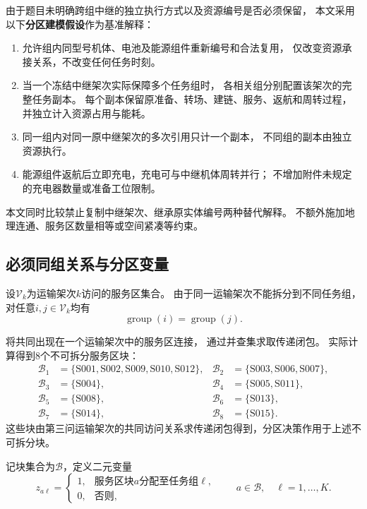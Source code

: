 \documentclass[bwprint]{gmcmthesis}
\begin{document}
由于题目未明确跨组中继的独立执行方式以及资源编号是否必须保留，
本文采用以下\textbf{分区建模假设}作为基准解释：

\begin{enumerate}
    \item 允许组内同型号机体、电池及能源组件重新编号和合法复用，
    仅改变资源承接关系，不改变任何任务时刻。

    \item 当一个冻结中继架次实际保障多个任务组时，
    各相关组分别配置该架次的完整任务副本。
    每个副本保留原准备、转场、建链、服务、返航和周转过程，
    并独立计入资源占用与能耗。

    \item 同一组内对同一原中继架次的多次引用只计一个副本，
    不同组的副本由独立资源执行。

    \item 能源组件返航后立即充电，充电可与中继机体周转并行；
    不增加附件未规定的充电器数量或准备工位限制。
\end{enumerate}

本文同时比较禁止复制中继架次、继承原实体编号两种替代解释。
不额外施加地理连通、服务区数量相等或空间紧凑等约束。

\subsection{必须同组关系与分区变量}

设$\mathcal{V}_k$为运输架次$k$访问的服务区集合。
由于同一运输架次不能拆分到不同任务组，
对任意$i,j\in\mathcal{V}_k$均有
\begin{equation}
\operatorname{group}(i)=\operatorname{group}(j).
\end{equation}

将共同出现在一个运输架次中的服务区连接，
通过并查集求取传递闭包。
实际计算得到8个不可拆分服务区块：
\begin{align*}
\mathcal B_1&=\{\mathrm{S001,S002,S009,S010,S012}\},&
\mathcal B_2&=\{\mathrm{S003,S006,S007}\},\\
\mathcal B_3&=\{\mathrm{S004}\},&
\mathcal B_4&=\{\mathrm{S005,S011}\},\\
\mathcal B_5&=\{\mathrm{S008}\},&
\mathcal B_6&=\{\mathrm{S013}\},\\
\mathcal B_7&=\{\mathrm{S014}\},&
\mathcal B_8&=\{\mathrm{S015}\}.
\end{align*}
这些块由第三问运输架次的共同访问关系求传递闭包得到，分区决策作用于上述不可拆分块。

记块集合为$\mathcal{B}$，定义二元变量
\begin{equation}
z_{a\ell}=
\begin{cases}
1, & \text{服务区块$a$分配至任务组$\ell$},\\
0, & \text{否则},
\end{cases}
\qquad
a\in\mathcal{B},\quad \ell=1,\ldots,K.
\end{equation}
\end{document}
